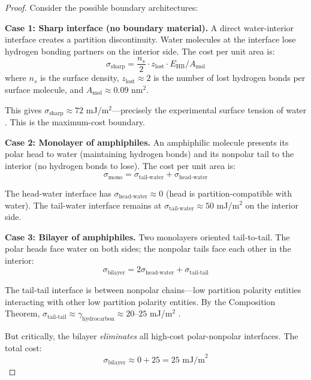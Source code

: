 \documentclass[twocolumn,10pt]{article}
\theoremstyle{remark}
\begin{document}
\begin{proof}
Consider the possible boundary architectures:

\textbf{Case 1: Sharp interface (no boundary material).}
A direct water-interior interface creates a partition discontinuity. Water molecules at the interface lose hydrogen bonding partners on the interior side. The cost per unit area is:
\begin{equation}
    \sigma_{\text{sharp}} = \frac{n_s}{2} \cdot z_{\text{lost}} \cdot E_{\text{HB}} / A_{\text{mol}}
\end{equation}
where $n_s$ is the surface density, $z_{\text{lost}} \approx 2$ is the number of lost hydrogen bonds per surface molecule, and $A_{\text{mol}} \approx 0.09$ nm$^2$.

This gives $\sigma_{\text{sharp}} \approx 72$ mJ/m$^2$---precisely the experimental surface tension of water \cite{vargaftik1983}. This is the maximum-cost boundary.

\textbf{Case 2: Monolayer of amphiphiles.}
An amphiphilic molecule presents its polar head to water (maintaining hydrogen bonds) and its nonpolar tail to the interior (no hydrogen bonds to lose). The cost per unit area is:
\begin{equation}
    \sigma_{\text{mono}} = \sigma_{\text{tail-water}} + \sigma_{\text{head-water}}
\end{equation}

The head-water interface has $\sigma_{\text{head-water}} \approx 0$ (head is partition-compatible with water). The tail-water interface remains at $\sigma_{\text{tail-water}} \approx 50$ mJ/m$^2$ on the interior side.

\textbf{Case 3: Bilayer of amphiphiles.}
Two monolayers oriented tail-to-tail. The polar heads face water on both sides; the nonpolar tails face each other in the interior:
\begin{equation}
    \sigma_{\text{bilayer}} = 2\sigma_{\text{head-water}} + \sigma_{\text{tail-tail}}
\end{equation}

The tail-tail interface is between nonpolar chains---low partition polarity entities interacting with other low partition polarity entities. By the Composition Theorem, $\sigma_{\text{tail-tail}} \approx \gamma_{\text{hydrocarbon}} \approx 20$--$25$ mJ/m$^2$ \cite{israelachvili2011}.

But critically, the bilayer \emph{eliminates} all high-cost polar-nonpolar interfaces. The total cost:
\begin{equation}
    \sigma_{\text{bilayer}} \approx 0 + 25 = 25 \text{ mJ/m}^2
\end{equation}


\end{proof}
\end{document}
